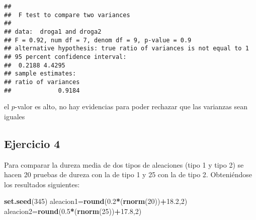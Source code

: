 \documentclass[
]{article}
\newenvironment{Shaded}{\begin{snugshade}}{\end{snugshade}}
\newcommand{\DecValTok}[1]{\textcolor[rgb]{0.00,0.00,0.81}{#1}}
\newcommand{\FloatTok}[1]{\textcolor[rgb]{0.00,0.00,0.81}{#1}}
\newcommand{\KeywordTok}[1]{\textcolor[rgb]{0.13,0.29,0.53}{\textbf{#1}}}
\newcommand{\NormalTok}[1]{#1}
\newcommand{\OperatorTok}[1]{\textcolor[rgb]{0.81,0.36,0.00}{\textbf{#1}}}
\begin{document}
\begin{verbatim}
## 
##  F test to compare two variances
## 
## data:  droga1 and droga2
## F = 0.92, num df = 7, denom df = 9, p-value = 0.9
## alternative hypothesis: true ratio of variances is not equal to 1
## 95 percent confidence interval:
##  0.2188 4.4295
## sample estimates:
## ratio of variances 
##             0.9184
\end{verbatim}

el \(p\)-valor es alto, no hay evidencias para poder rechazar que las
varianzas sean iguales

\hypertarget{ejercicio-4}{%
\subsection{Ejercicio 4}\label{ejercicio-4}}

Para comparar la dureza media de dos tipos de aleaciones (tipo 1 y tipo
2) se hacen 20 pruebas de dureza con la de tipo 1 y 25 con la de tipo 2.
Obteniéndose los resultados siguientes:

\begin{Shaded}
\begin{Highlighting}[]
\KeywordTok{set.seed}\NormalTok{(}\DecValTok{345}\NormalTok{)}
\NormalTok{aleacion1=}\KeywordTok{round}\NormalTok{(}\FloatTok{0.2}\OperatorTok{*}\NormalTok{(}\KeywordTok{rnorm}\NormalTok{(}\DecValTok{20}\NormalTok{))}\OperatorTok{+}\FloatTok{18.2}\NormalTok{,}\DecValTok{2}\NormalTok{)}
\NormalTok{aleacion2=}\KeywordTok{round}\NormalTok{(}\FloatTok{0.5}\OperatorTok{*}\NormalTok{(}\KeywordTok{rnorm}\NormalTok{(}\DecValTok{25}\NormalTok{))}\OperatorTok{+}\FloatTok{17.8}\NormalTok{,}\DecValTok{2}\NormalTok{)}
\end{Highlighting}
\end{Shaded}
\end{document}
